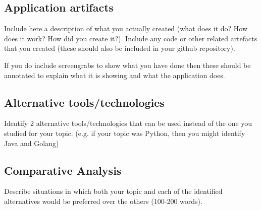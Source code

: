 \documentclass[a4paper, 11pt]{report}
\begin{document}
\subsection{Application artifacts}

Include here a description of what you actually created (what does it do? How does it work? How did you create it?). Include any code or other related artefacts that you created (these should also be included in your github repository).

If you do include screengrabs to show what you have done then these should be annotated to explain what it is showing and what the application does.

\subsection{Alternative tools/technologies}
Identify 2 alternative tools/technologies that can be used instead of the one you studied for your topic. (e.g. if your topic was Python, then you might identify Java and Golang)
\subsection{Comparative Analysis}
Describe situations in which both your topic and each of the identified alternatives would be preferred over the others (100-200 words).




\newpage



\end{document}
